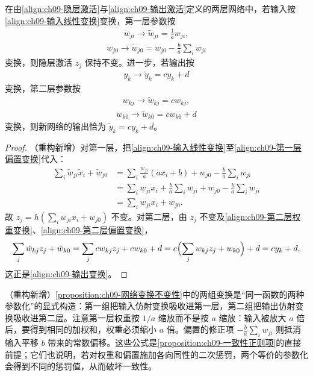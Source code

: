 \documentclass[../../main.tex]{subfiles}
\begin{document}
\begin{proposition}[网络映射的线性变换不变性]\label{proposition:ch09-网络变换不变性}
在由\eqref{align:ch09-隐层激活}与\eqref{align:ch09-输出激活}定义的两层网络中，若输入按\eqref{align:ch09-输入线性变换}变换，第一层参数按
\begin{align}
w_{ji}\longrightarrow\tilde{w}_{ji}=\frac{1}{a}w_{ji},
\label{align:ch09-第一层权重变换}
\end{align}
\begin{align}
w_{j0}\longrightarrow\tilde{w}_{j0}=w_{j0}-\frac{b}{a}\sum_{i}w_{ji}
\label{align:ch09-第一层偏置变换}
\end{align}
变换，则隐层激活 $z_{j}$ 保持不变。进一步，若输出按
\begin{align}
y_{k}\longrightarrow\tilde{y}_{k}=cy_{k}+d
\label{align:ch09-输出变换}
\end{align}
变换，第二层参数按
\begin{align}
w_{kj}\longrightarrow\tilde{w}_{kj}=cw_{kj},
\label{align:ch09-第二层权重变换}
\end{align}
\begin{align}
w_{k0}\longrightarrow\tilde{w}_{k0}=cw_{k0}+d
\label{align:ch09-第二层偏置变换}
\end{align}
变换，则新网络的输出恰为 $\tilde{y}_{k}=cy_{k}+d$。
\end{proposition}

\begin{proof}
（重构新增）对第一层，把\eqref{align:ch09-输入线性变换}至\eqref{align:ch09-第一层偏置变换}代入：
\begin{align*}
\sum_{i}\tilde{w}_{ji}\tilde{x}_{i}+\tilde{w}_{j0}
&=\sum_{i}\frac{w_{ji}}{a}(ax_{i}+b)+w_{j0}-\frac{b}{a}\sum_{i}w_{ji}\\
&=\sum_{i}w_{ji}x_{i}+\frac{b}{a}\sum_{i}w_{ji}+w_{j0}-\frac{b}{a}\sum_{i}w_{ji}\\
&=\sum_{i}w_{ji}x_{i}+w_{j0}.
\end{align*}
故 $z_{j}=h(\sum_{i}w_{ji}x_{i}+w_{j0})$ 不变。对第二层，由 $z_{j}$ 不变及\eqref{align:ch09-第二层权重变换}、\eqref{align:ch09-第二层偏置变换}，
\begin{align*}
\sum_{j}\tilde{w}_{kj}z_{j}+\tilde{w}_{k0}=\sum_{j}cw_{kj}z_{j}+cw_{k0}+d=c\Bigl(\sum_{j}w_{kj}z_{j}+w_{k0}\Bigr)+d=cy_{k}+d,
\end{align*}
这正是\eqref{align:ch09-输出变换}。
\end{proof}

\begin{remark}（重构新增）\cref{proposition:ch09-网络变换不变性}中的两组变换是“同一函数的两种参数化”的显式构造：第一组把输入仿射变换吸收进第一层，第二组把输出仿射变换吸收进第二层。注意第一层权重按 $1/a$ 缩放而不是按 $a$ 缩放：输入被放大 $a$ 倍后，要得到相同的加权和，权重必须缩小 $a$ 倍。偏置的修正项 $-\frac{b}{a}\sum_{i}w_{ji}$ 则抵消输入平移 $b$ 带来的常数偏移。这些公式是\cref{proposition:ch09-一致性正则项}的直接前提；它们也说明，若对权重和偏置施加各向同性的二次惩罚，两个等价的参数化会得到不同的惩罚值，从而破坏一致性。
\end{remark}
\end{document}
